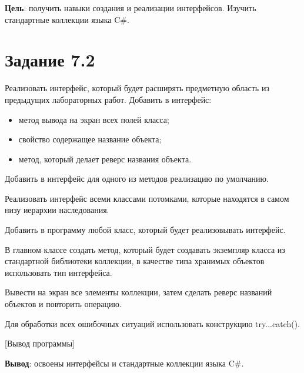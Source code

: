 \documentclass{bsuir}
\newcommand{\csharp}{C{\liberationrm\#}}
\begin{document}

    \textbf{Цель}: получить навыки создания и реализации интерфейсов. Изучить
    стандартные коллекции языка \csharp.

    \section*{Задание 7.2}

    Реализовать интерфейс, который будет расширять предметную область из
    предыдущих лабораторных работ. Добавить в интерфейс:
  
    \begin{itemize}
        \item метод вывода на экран всех полей класса;
        \item свойство содержащее название объекта;
        \item метод, который делает реверс названия объекта.
    \end{itemize}
    
    Добавить в интерфейс для одного из методов реализацию по умолчанию.
  
    Реализовать интерфейс всеми классами потомками, которые находятся в самом
    низу иерархии наследования.
  
    Добавить в программу любой класс, который будет реализовывать интерфейс.
  
    В главном классе создать метод, который будет создавать экземпляр класса из
    стандартной библиотеки коллекции, в качестве типа хранимых объектов
    использовать тип интерфейса.
  
    Вывести на экран все элементы коллекции, затем сделать реверс названий
    объектов и повторить операцию.
  
    Для обработки всех ошибочных ситуаций использовать конструкцию
    try...catch().
  

    [Вывод программы]

    \textbf{Вывод}: освоены интерфейсы и стандартные коллекции языка \csharp.
\end{document}
